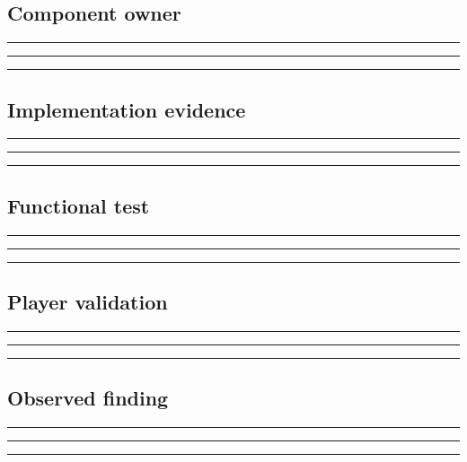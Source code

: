 \documentclass[11pt]{article}
\begin{document}
\subsection{Component owner}
\noindent\rule{\linewidth}{0.3pt}\par\vspace{0.18in}
\noindent\rule{\linewidth}{0.3pt}\par\vspace{0.18in}
\noindent\rule{\linewidth}{0.3pt}\par\vspace{0.14in}

\subsection{Implementation evidence}
\noindent\rule{\linewidth}{0.3pt}\par\vspace{0.18in}
\noindent\rule{\linewidth}{0.3pt}\par\vspace{0.18in}
\noindent\rule{\linewidth}{0.3pt}\par\vspace{0.14in}

\subsection{Functional test}
\noindent\rule{\linewidth}{0.3pt}\par\vspace{0.18in}
\noindent\rule{\linewidth}{0.3pt}\par\vspace{0.18in}
\noindent\rule{\linewidth}{0.3pt}\par\vspace{0.14in}

\subsection{Player validation}
\noindent\rule{\linewidth}{0.3pt}\par\vspace{0.18in}
\noindent\rule{\linewidth}{0.3pt}\par\vspace{0.18in}
\noindent\rule{\linewidth}{0.3pt}\par\vspace{0.14in}

\subsection{Observed finding}
\noindent\rule{\linewidth}{0.3pt}\par\vspace{0.18in}
\noindent\rule{\linewidth}{0.3pt}\par\vspace{0.18in}
\noindent\rule{\linewidth}{0.3pt}\par\vspace{0.14in}
\end{document}
